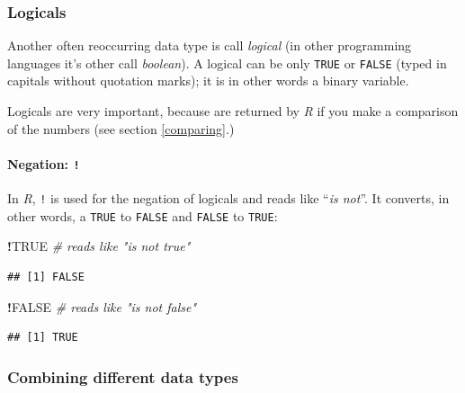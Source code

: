 \documentclass[
]{scrartcl}
\newenvironment{Shaded}{\begin{snugshade}}{\end{snugshade}}
\newcommand{\CommentTok}[1]{\textcolor[rgb]{0.56,0.35,0.01}{\textit{#1}}}
\newcommand{\ConstantTok}[1]{\textcolor[rgb]{0.56,0.35,0.01}{#1}}
\newcommand{\SpecialCharTok}[1]{\textcolor[rgb]{0.81,0.36,0.00}{\textbf{#1}}}
\begin{document}
\subsubsection{Logicals}\label{logicals}

Another often reoccurring data type is call \emph{logical} (in other
programming languages it's other call \emph{boolean}). A logical can be only
\texttt{TRUE} or \texttt{FALSE} (typed in capitals without quotation marks); it is in
other words a binary variable.

Logicals are very important, because are returned by \emph{R} if you make a
comparison of the numbers (see section \ref{comparing}.)

\paragraph*{\texorpdfstring{Negation: \texttt{!}}{Negation: !}}\label{negation}

In \emph{R}, \texttt{!} is used for the negation of logicals and reads like ``\emph{is
not}''. It converts, in other words, a \texttt{TRUE} to \texttt{FALSE} and \texttt{FALSE} to
\texttt{TRUE}:

\begin{Shaded}
\begin{Highlighting}[]
\SpecialCharTok{!}\ConstantTok{TRUE}    \CommentTok{\#  reads like "is not true"}
\end{Highlighting}
\end{Shaded}

\begin{verbatim}
## [1] FALSE
\end{verbatim}

\begin{Shaded}
\begin{Highlighting}[]
\SpecialCharTok{!}\ConstantTok{FALSE}   \CommentTok{\#  reads like "is not false"}
\end{Highlighting}
\end{Shaded}

\begin{verbatim}
## [1] TRUE
\end{verbatim}

\subsubsection{Combining different data types}\label{comparediffdata}
\end{document}

